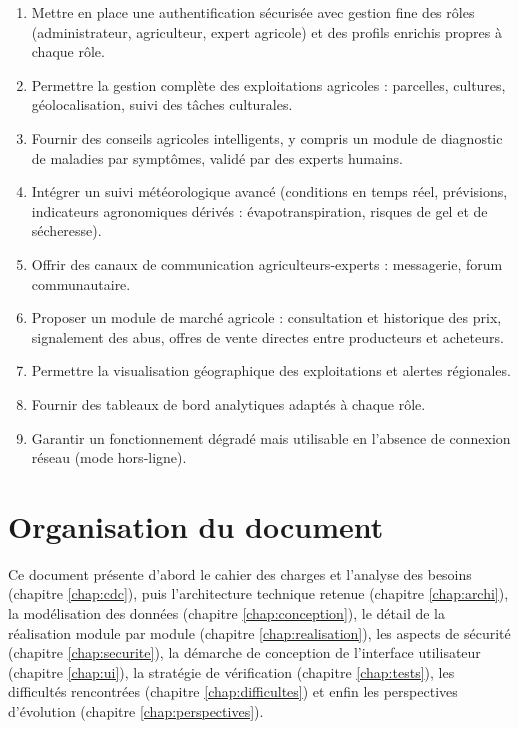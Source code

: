 \documentclass[12pt,a4paper]{report}
\begin{document}
\begin{enumerate}
    \item Mettre en place une authentification sécurisée avec gestion fine des rôles (administrateur, agriculteur, expert agricole) et des profils enrichis propres à chaque rôle.
    \item Permettre la gestion complète des exploitations agricoles : parcelles, cultures, géolocalisation, suivi des tâches culturales.
    \item Fournir des conseils agricoles intelligents, y compris un module de diagnostic de maladies par symptômes, validé par des experts humains.
    \item Intégrer un suivi météorologique avancé (conditions en temps réel, prévisions, indicateurs agronomiques dérivés : évapotranspiration, risques de gel et de sécheresse).
    \item Offrir des canaux de communication agriculteurs-experts : messagerie, forum communautaire.
    \item Proposer un module de marché agricole : consultation et historique des prix, signalement des abus, offres de vente directes entre producteurs et acheteurs.
    \item Permettre la visualisation géographique des exploitations et alertes régionales.
    \item Fournir des tableaux de bord analytiques adaptés à chaque rôle.
    \item Garantir un fonctionnement dégradé mais utilisable en l'absence de connexion réseau (mode hors-ligne).
\end{enumerate}

\section{Organisation du document}

Ce document présente d'abord le cahier des charges et l'analyse des besoins (chapitre \ref{chap:cdc}), puis l'architecture technique retenue (chapitre \ref{chap:archi}), la modélisation des données (chapitre \ref{chap:conception}), le détail de la réalisation module par module (chapitre \ref{chap:realisation}), les aspects de sécurité (chapitre \ref{chap:securite}), la démarche de conception de l'interface utilisateur (chapitre \ref{chap:ui}), la stratégie de vérification (chapitre \ref{chap:tests}), les difficultés rencontrées (chapitre \ref{chap:difficultes}) et enfin les perspectives d'évolution (chapitre \ref{chap:perspectives}).
\end{document}
